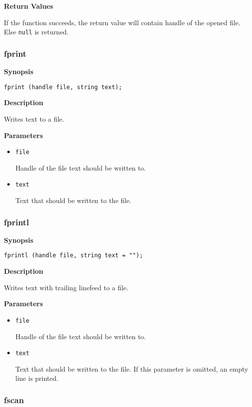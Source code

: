 \documentclass[a4paper, 10pt, titlepage]{article}
\begin{document}
\textbf{Return Values}

If the function succeeds, the return value will contain handle of the opened file. Else \texttt{null} is returned.

\subsubsection{fprint}

\textbf{Synopsis}

\begin{verbatim}
fprint (handle file, string text);
\end{verbatim}

\textbf{Description}

Writes text to a file.

\textbf{Parameters}

\begin{itemize}
\item \texttt{file}

Handle of the file text should be written to.

\item \texttt{text}

Text that should be written to the file.
\end{itemize}

\subsubsection{fprintl}

\textbf{Synopsis}

\begin{verbatim}
fprintl (handle file, string text = "");
\end{verbatim}

\textbf{Description}

Writes text with trailing linefeed to a file.

\textbf{Parameters}

\begin{itemize}
\item \texttt{file}

Handle of the file text should be written to.

\item \texttt{text}

Text that should be written to the file. If this parameter is omitted, an empty line is printed.
\end{itemize}

\subsubsection{fscan}
\end{document}
